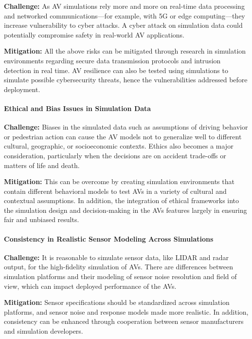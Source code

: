 \documentclass[lettersize,journal]{IEEEtran}
\begin{document}
\textbf{Challenge:} As AV simulations rely more and more on real-time data processing and networked communications—for example, with 5G or edge computing—they increase vulnerability to cyber attacks. A cyber attack on simulation data could potentially compromise safety in real-world AV applications.

\textbf{Mitigation:} All the above risks can be mitigated through research in simulation environments regarding secure data transmission protocols and intrusion detection in real time. AV resilience can also be tested using simulations to simulate possible cybersecurity threats, hence the vulnerabilities addressed before deployment.

\paragraph{Ethical and Bias Issues in Simulation Data}

\textbf{Challenge:} Biases in the simulated data such as assumptions of driving behavior or pedestrian action can cause the AV models not to generalize well to different cultural, geographic, or socioeconomic contexts. Ethics also becomes a major consideration, particularly when the decisions are on accident trade-offs or matters of life and death.

\textbf{Mitigation:} This can be overcome by creating simulation environments that contain different behavioral models to test AVs in a variety of cultural and contextual assumptions. In addition, the integration of ethical frameworks into the simulation design and decision-making in the AVs features largely in ensuring fair and unbiased results.

\paragraph{Consistency in Realistic Sensor Modeling Across Simulations}

\textbf{Challenge:} It is reasonable to simulate sensor data, like LIDAR and radar output, for the high-fidelity simulation of AVs. There are differences between simulation platforms and their modeling of sensor noise resolution and field of view, which can impact deployed performance of the AVs.

\textbf{Mitigation:} Sensor specifications should be standardized across simulation platforms, and sensor noise and response models made more realistic. In addition, consistency can be enhanced through cooperation between sensor manufacturers and simulation developers.
\end{document}
